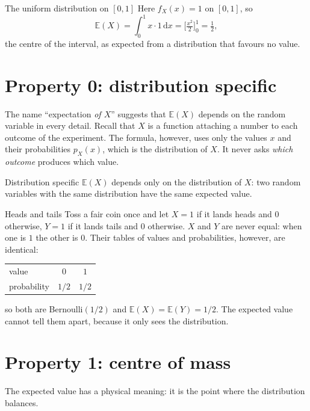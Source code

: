 \documentclass[a4paper,12pt,oneside]{report}
\begin{document}
\begin{framedexample}{The uniform distribution on $[0,1]$}
Here $f_X(x)=1$ on $[0,1]$, so
\[
\mathbb{E}(X)=\int_0^1 x\cdot1\,\mathrm{d}x=\Big[\tfrac{x^2}{2}\Big]_0^1=\tfrac12,
\]
the centre of the interval, as expected from a distribution that favours
no value.
\end{framedexample}

\section{Property 0: distribution specific}

The name ``expectation \emph{of $X$}'' suggests that $\mathbb{E}(X)$
depends on the random variable in every detail. Recall that $X$ is a
function attaching a number to each outcome of the experiment. The formula,
however, uses only the values $x$ and their probabilities $p_X(x)$, which
is the distribution of $X$. It never asks \emph{which outcome} produces
which value.

\begin{framedprop}{Distribution specific}
$\mathbb{E}(X)$ depends only on the distribution of $X$: two random
variables with the same distribution have the same expected value.
\end{framedprop}

\begin{framedexample}{Heads and tails}
Toss a fair coin once and let $X=1$ if it lands heads and $0$ otherwise,
$Y=1$ if it lands tails and $0$ otherwise. $X$ and $Y$ are never equal:
when one is $1$ the other is $0$. Their tables of values and probabilities,
however, are identical:
\begin{center}
\begin{tabular}{@{}lcc@{}}
\toprule
value & $0$ & $1$\\
probability & $1/2$ & $1/2$\\
\bottomrule
\end{tabular}
\end{center}
so both are Bernoulli$(1/2)$ and $\mathbb{E}(X)=\mathbb{E}(Y)=1/2$. The
expected value cannot tell them apart, because it only sees the
distribution.
\end{framedexample}

\section{Property 1: centre of mass}

The expected value has a physical meaning: it is the point where the
distribution balances.
\end{document}
